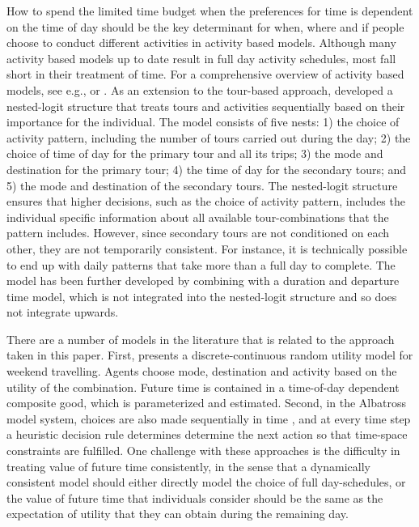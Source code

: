 How to spend the limited time budget when the preferences for time is dependent on the time of day should be the key determinant for when, where and if people choose to conduct different activities in activity based models. Although many activity based models up to date result in full day activity schedules, most fall short in their treatment of time. For a comprehensive overview of activity based models, see e.g., \citet{Pinjari11} or \citet{Rasouli14}. As an extension to the tour-based approach, \citet{Bowman01} developed a nested-logit structure that treats tours and activities sequentially based on their importance for the individual. The model consists of five nests: 1) the choice of activity pattern, including the number of tours carried out during the day; 2) the choice of time of day for the primary tour and all its trips; 3) the mode and destination for the primary tour; 4) the time of day for the secondary tours; and 5) the mode and destination of the secondary tours. The nested-logit structure ensures that higher decisions, such as the choice of activity pattern, includes the individual specific information about all available tour-combinations that the pattern includes. However, since secondary tours are not conditioned on each other, they are not temporarily consistent. For instance, it is technically possible to end up with daily patterns that take more than a full day to complete. The model has been further developed by combining with a duration and departure time model, which is not integrated into the nested-logit structure \citep{Vovsha04,Bradley10} and so does not integrate upwards. 

There are a number of models in the literature that is related to the approach taken in this paper. First, \citet{Habib11RUM} presents a discrete-continuous random utility model for weekend travelling. Agents choose mode, destination and activity based on the utility of the combination. Future time is contained in a time-of-day dependent composite good, which is parameterized and estimated. Second, in the Albatross model system, choices are also made sequentially in time \citep{Arentze00}, and at every time step a heuristic decision rule determines determine the next action so that time-space constraints are fulfilled. One challenge with these approaches is the difficulty in treating value of future time consistently, in the sense that a dynamically consistent model should either directly model the choice of full day-schedules, or the value of future time that individuals consider should be the same as the expectation of utility that they can obtain during the remaining day.

